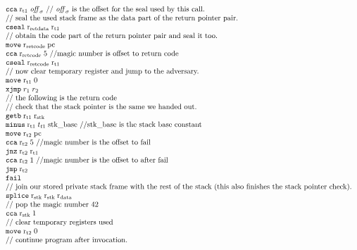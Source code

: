 \documentclass[a4paper]{article}
\begin{document}
\[\begin{array}{l}
    \tcca{\rtmp{1}}{\offsigma}\text{ // $\offsigma$ is the offset for the seal used by this call.}\\
    \text{// seal the used stack frame as the data part of the return pointer pair.}\\
    \tcseal{\rretd}{\rtmp{1}}\\
    \text{// obtain the code part of the return pointer pair and seal it too.}\\
    \tmove{\rretc}{\pcreg}\\
    \tcca{\rretc}{5} \text{ //magic number is offset to return code}\\
    \tcseal{\rretc}{\rtmp{1}}\\
    \text{// now clear temporary register and jump to the adversary.}\\
    \tmove{\rtmp{1}}{0}\\
    \txjmp{r_1}{r_2}\\
    \text{// the following is the return code}\\
    \text{// check that the stack pointer is the same we handed out.}\\
    \tgetb{\rtmp{1}}{\rstk}\\
    \tminus{\rtmp{1}}{t_{t1}}{\stkb} \text{ //$\stkb$ is the stack base constant} \\
    \tmove{\rtmp{2}}{\pcreg}\\
    \tcca{\rtmp{2}}{5} \text{ //magic number is the offset to fail} \\
    \tjnz{\rtmp{2}}{\rtmp{1}} \\
    \tcca{\rtmp{2}}{1} \text{ //magic number is the offset to after fail} \\
    \tjmp{\rtmp{2}} \\
    \tfail \\
    \text{// join our stored private stack frame with the rest of the stack (this also finishes the stack pointer check).}\\
    \tsplice{\rstk}{\rstk}{\rdata} \\
    \text{// pop the magic number 42}\\
    \tcca{\rstk}{1}\\
    \text{// clear temporary registers used}\\
    \tmove{\rtmp{2}}{0}\\
    \text{// continue program after invocation.}
  \end{array}
\]
\end{document}

